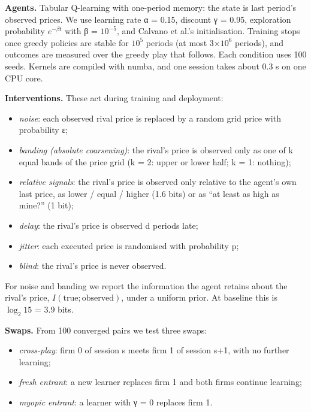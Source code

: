 \documentclass[11pt,a4paper]{article}
\providecommand{\tightlist}{\setlength{\itemsep}{1pt}\setlength{\parskip}{0pt}}
\begin{document}
\textbf{Agents.} Tabular Q-learning with one-period memory: the state is last period's observed prices. We use learning rate α = 0.15, discount γ = 0.95, exploration probability \(e^{-\beta t}\) with β = \(10^{-5}\), and Calvano et al.'s initialisation. Training stops once greedy policies are stable for \(10^{5}\) periods (at most 3×\(10^{6}\) periods), and outcomes are measured over the greedy play that follows. Each condition uses 100 seeds. Kernels are compiled with numba, and one session takes about 0.3 s on one CPU core.

\textbf{Interventions.} These act during training and deployment:

\begin{itemize}
\tightlist
\item
  \emph{noise}: each observed rival price is replaced by a random grid price with probability ε;
\item
  \emph{banding (absolute coarsening)}: the rival's price is observed only as one of k equal bands of the price grid (k = 2: upper or lower half; k = 1: nothing);
\item
  \emph{relative signals}: the rival's price is observed only relative to the agent's own last price, as lower / equal / higher (1.6 bits) or as ``at least as high as mine?'' (1 bit);
\item
  \emph{delay}: the rival's price is observed d periods late;
\item
  \emph{jitter}: each executed price is randomised with probability p;
\item
  \emph{blind}: the rival's price is never observed.
\end{itemize}

For noise and banding we report the information the agent retains about the rival's price, \(I(\text{true};\text{observed})\), under a uniform prior. At baseline this is \(\log_2 15\) = 3.9 bits.

\textbf{Swaps.} From 100 converged pairs we test three swaps:

\begin{itemize}
\tightlist
\item
  \emph{cross-play}: firm 0 of session s meets firm 1 of session s+1, with no further learning;
\item
  \emph{fresh entrant}: a new learner replaces firm 1 and both firms continue learning;
\item
  \emph{myopic entrant}: a learner with γ = 0 replaces firm 1.
\end{itemize}
\end{document}
